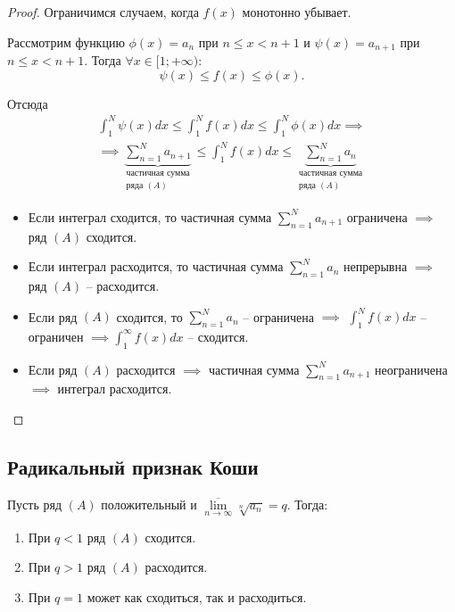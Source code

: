 \begin{proof}
    Ограничимся случаем, когда $f(x)$ монотонно убывает.

    Рассмотрим функцию $\phi(x) = a_n$ при $n \leqslant x < n+1$ и $\psi(x) = a_{n+1}$ при $n\leqslant x <n + 1$. Тогда $\forall x \in [1;+\infty)$:
    \[
        \psi(x) \leqslant f(x) \leqslant\phi(x).
    \]

    Отсюда
    \begin{multline*}
        \int_{1}^{N}\psi(x)dx \leqslant \int_{1}^{N}f(x)dx \leqslant\int_{1}^{N}\phi(x)dx \implies \\
        \implies \underbrace{\sum_{n=1}^{N}a_{n+1}}_{\begin{array}{c}
            \text{частичная сумма} \\
            \text{ряда }(A)
        \end{array}} \leqslant \int_{1}^{N}f(x)dx \leqslant \underbrace{\sum_{n=1}^{N}a_n}_{\begin{array}{c}
                \text{частичная сумма} \\
                \text{ряда }(A)
            \end{array}}
    \end{multline*}
    \begin{itemize}
        \item Если интеграл сходится, то частичная сумма $\sum_{n=1}^{N}a_{n+1}$ ограничена $\implies$ ряд $(A)$ сходится.

        \item Если интеграл расходится, то частичная сумма $\sum_{n=1}^{N}a_n$ непрерывна $\implies$ ряд $(A)$ -- расходится.

        \item Если ряд $(A)$ сходится, то $\sum_{n=1}^{N}a_n$ -- ограничена $\implies$ $\int_{1}^{N}f(x)dx$ -- ограничен $\implies \int_{1}^{\infty}f(x)dx$ -- сходится.

        \item Если ряд $(A)$ расходится $\implies$ частичная сумма $\sum_{n=1}^{N}a_{n+1}$ неограничена $\implies$ интеграл расходится.
    \end{itemize}
\end{proof}

\subsection{Радикальный признак Коши}

\begin{theorem}
    Пусть ряд $(A)$ положительный и $\underset{n\rightarrow\infty}{\overline{\lim}}\sqrt[n]{a_n} = q$. Тогда:
    \begin{enumerate}
        \item При $q < 1$ ряд $(A)$ сходится.
        \item При $q > 1$ ряд $(A)$ расходится.
        \item При $q = 1$ может как сходиться, так и расходиться.
    \end{enumerate}
\end{theorem}

